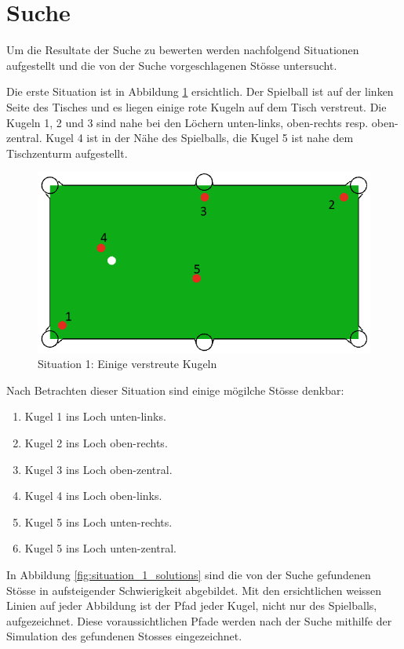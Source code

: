 \section{Suche}

Um die Resultate der Suche zu bewerten werden nachfolgend Situationen aufgestellt und die von der Suche
vorgeschlagenen Stösse untersucht.

Die erste Situation ist in Abbildung \ref{fig:search_situation_1} ersichtlich.
Der Spielball ist auf der linken Seite des Tisches und es liegen einige rote Kugeln auf dem Tisch verstreut.
Die Kugeln 1, 2 und 3 sind nahe bei den Löchern unten-links, oben-rechts resp. oben-zentral.
Kugel 4 ist in der Nähe des Spielballs, die Kugel 5 ist nahe dem Tischzenturm aufgestellt.

%
%
\begin{figure}[h!]
    \begin{center}
        \includegraphics[width=0.4\linewidth]{../common/04_results/resources/simple_search/situation_diverse.PNG}
    \end{center}
    \caption{Situation 1: Einige verstreute Kugeln}
    \label{fig:search_situation_1}
\end{figure}

Nach Betrachten dieser Situation sind einige mögilche Stösse denkbar:
\begin{enumerate}
    \item Kugel 1 ins Loch unten-links.
    \item Kugel 2 ins Loch oben-rechts.
    \item Kugel 3 ins Loch oben-zentral.
    \item Kugel 4 ins Loch oben-links.
    \item Kugel 5 ins Loch unten-rechts.
    \item Kugel 5 ins Loch unten-zentral.
\end{enumerate}

In Abbildung \ref{fig:situation_1_solutions} sind die von der Suche gefundenen Stösse in aufsteigender Schwierigkeit abgebildet.
Mit den ersichtlichen weissen Linien auf jeder Abbildung ist der Pfad jeder Kugel, nicht nur des Spielballs, aufgezeichnet.
Diese voraussichtlichen Pfade werden nach der Suche mithilfe der Simulation des gefundenen Stosses eingezeichnet.

